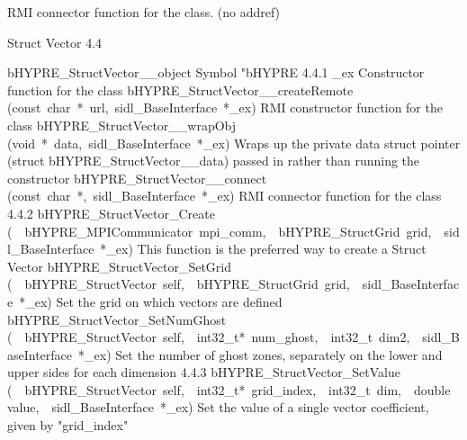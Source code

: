 \documentclass{article}
\begin{document}
\begin{cxxentry}
\begin{cxxentry}
\begin{cxxvariable}
\begin{cxxdoc}
RMI connector function for the class. (no addref)
\end{cxxdoc}
\end{cxxvariable}
\end{cxxentry}
\begin{cxxentry}
{}
        {Struct Vector}
        {}
        {
}
        {4.4}
\begin{cxxnames}
        {bHYPRE\_StructVector\_\_object}
        {}
        {
Symbol "bHYPRE}
        {4.4.1}
        {\_ex}
        {}
        {
Constructor function for the class}
        {}
\label{cxx.4.4.11}
        {bHYPRE\_StructVector\_\_createRemote}
        {(const\ char\ *\ url,\ sidl\_BaseInterface\ *\_ex)}
        {
RMI constructor function for the class}
        {}
\label{cxx.4.4.12}
        {bHYPRE\_StructVector\_\_wrapObj}
        {(void\ *\ data,\ sidl\_BaseInterface\ *\_ex)}
        {
Wraps up the private data struct pointer (struct bHYPRE\_StructVector\_\_data) passed in rather than running the constructor}
        {}
\label{cxx.4.4.13}
        {bHYPRE\_StructVector\_\_connect}
        {(const\ char\ *,\ sidl\_BaseInterface\ *\_ex)}
        {
RMI connector function for the class}
        {4.4.2}
        {bHYPRE\_StructVector\_Create}
        {(\ \ bHYPRE\_MPICommunicator\ mpi\_comm,\ \ bHYPRE\_StructGrid\ grid,\ \ sidl\_BaseInterface\ *\_ex)}
        {
This function is the preferred way to create a Struct Vector}
        {}
\label{cxx.4.4.14}
        {bHYPRE\_StructVector\_SetGrid}
        {(\ \ bHYPRE\_StructVector\ self,\ \ bHYPRE\_StructGrid\ grid,\ \ sidl\_BaseInterface\ *\_ex)}
        {
Set the grid on which vectors are defined}
        {}
\label{cxx.4.4.15}
        {bHYPRE\_StructVector\_SetNumGhost}
        {(\ \ bHYPRE\_StructVector\ self,\ \ int32\_t*\ num\_ghost,\ \ int32\_t\ dim2,\ \ sidl\_BaseInterface\ *\_ex)}
        {
Set the number of ghost zones, separately on the lower and upper sides
for each dimension}
        {4.4.3}
        {bHYPRE\_StructVector\_SetValue}
        {(\ \ bHYPRE\_StructVector\ self,\ \ int32\_t*\ grid\_index,\ \ int32\_t\ dim,\ \ double\ value,\ \ sidl\_BaseInterface\ *\_ex)}
        {
Set the value of a single vector coefficient, given by "grid\_index"}

\end{cxxnames}
\end{cxxentry}
\end{cxxentry}
\end{document}
